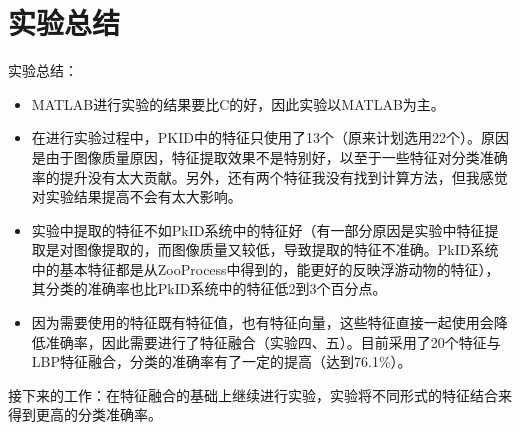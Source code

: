 \section{实验总结}
实验总结：
\begin{itemize}
\item MATLAB进行实验的结果要比C的好，因此实验以MATLAB为主。
\item 在进行实验过程中，PKID中的特征只使用了13个（原来计划选用22个）。原因是由于图像质量原因，特征提取效果不是特别好，以至于一些特征对分类准确率的提升没有太大贡献。另外，还有两个特征我没有找到计算方法，但我感觉对实验结果提高不会有太大影响。
\item 实验中提取的特征不如PkID系统中的特征好（有一部分原因是实验中特征提取是对图像提取的，而图像质量又较低，导致提取的特征不准确。PkID系统中的基本特征都是从ZooProcess中得到的，能更好的反映浮游动物的特征），其分类的准确率也比PkID系统中的特征低2到3个百分点。
\item 因为需要使用的特征既有特征值，也有特征向量，这些特征直接一起使用会降低准确率，因此需要进行了特征融合（实验四、五）。目前采用了20个特征与LBP特征融合，分类的准确率有了一定的提高（达到76.1\%）。
\end{itemize}

接下来的工作：在特征融合的基础上继续进行实验，实验将不同形式的特征结合来得到更高的分类准确率。
